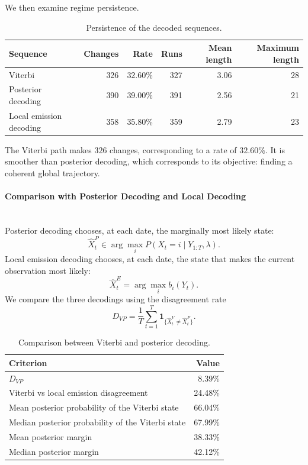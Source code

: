 \documentclass[11pt]{article}
\begin{document}
We then examine regime persistence.

\begin{table}[H]
\centering
\begin{tabular}{lrrrrr}
\toprule
Sequence & Changes & Rate & Runs & Mean length & Maximum length \\
\midrule
Viterbi & 326 & 32.60\% & 327 & 3.06 & 28 \\
Posterior decoding & 390 & 39.00\% & 391 & 2.56 & 21 \\
Local emission decoding & 358 & 35.80\% & 359 & 2.79 & 23 \\
\bottomrule
\end{tabular}
\caption{Persistence of the decoded sequences.}
\end{table}

The Viterbi path makes \(326\) changes, corresponding to a rate of \(32.60\%\). It is smoother than
posterior decoding, which corresponds to its objective: finding a coherent global trajectory.

\newpage

\paragraph{Comparison with Posterior Decoding and Local Decoding}\mbox{}\\

Posterior decoding chooses, at each date, the marginally most likely state:
\[
\hat X^P_t \in \arg\max_i P(X_t=i\mid Y_{1:T},\lambda).
\]
Local emission decoding chooses, at each date, the state that makes the current observation most likely:
\[
\widehat X_t^E=\arg\max_i b_i(Y_t).
\]
We compare the three decodings using the disagreement rate
\[
D_{VP}
=\frac{1}{T}\sum_{t=1}^T
\mathbf 1_{\{\hat X^V_t\neq \hat X^P_t\}}.
\]



\begin{table}[H]
\centering
\begin{tabular}{lr}
\toprule
Criterion & Value \\
\midrule
\(D_{VP}\) & 8.39\% \\
Viterbi vs local emission disagreement & 24.48\% \\
Mean posterior probability of the Viterbi state & 66.04\% \\
Median posterior probability of the Viterbi state & 67.99\% \\
Mean posterior margin & 38.33\% \\
Median posterior margin & 42.12\% \\
\bottomrule
\end{tabular}
\caption{Comparison between Viterbi and posterior decoding.}
\end{table}
\end{document}
